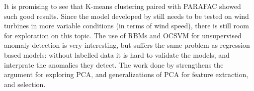 It is promising to see that K-means clustering paired with PARAFAC showed such good results. 
Since the model developed by \textcite{fault_detect_PARAFAC_k_means} still needs to be tested on wind turbines in more variable conditions (in terms of wind speed), there is still room for exploration on this topic. 
The use of RBMs and OCSVM for unsupervised anomaly detection is very interesting, but suffers the same problem as regression based models: without labelled data it is hard to validate the models, and interprate the anomalies they detect. 
The work done by \textcite{multiway_PCA_multivar_inference_cm_wt} strengthens the argument for exploring PCA, and generalizations of PCA for feature extraction, and selection.


